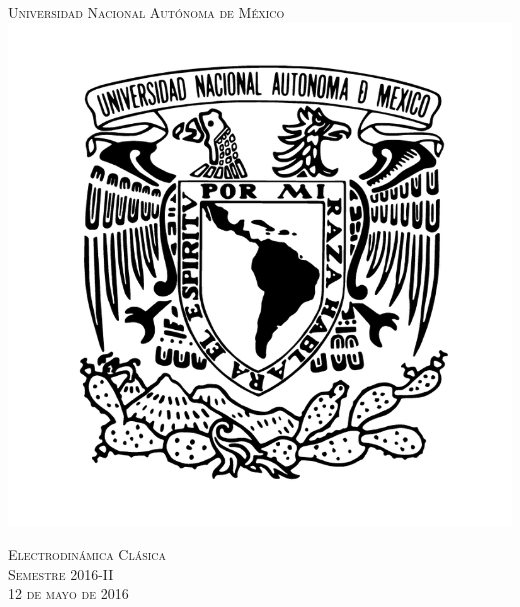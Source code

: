 \documentclass[a4paper,11pt]{article}
\numberwithin{equation}{section}
\begin{document}
\begin{titlepage}
\thispagestyle{fancy}

\newcommand{\HRule}{\rule{\linewidth}{0.5mm}} %

\center %
 

\textsc{\LARGE Universidad Nacional Autónoma de México}\\[0.3cm] %


\includegraphics[scale=0.17]{unam}


\textsc{\Large Electrodinámica Clásica}\\[0.3cm] %
\textsc{\large Semestre 2016-II}\\[0.3cm] %
\textsc{\large 12 de mayo de 2016}\\ %


\end{titlepage}
\end{document}
